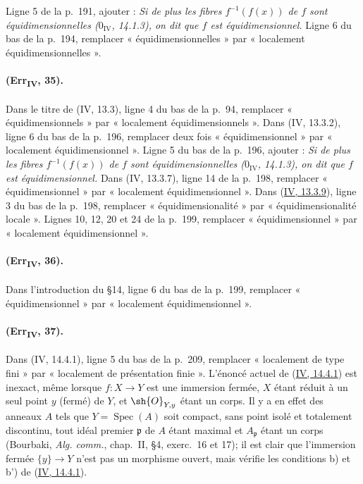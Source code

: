 Ligne 5 de la p.~191, ajouter : \emph{Si de plus les fibres
$f^{-1}(f(x))$ de $f$ sont équidimensionnelles ($0_{\mathrm{IV}}$,
14.1.3), on dit que $f$ est équidimensionnel.} Ligne 6 du bas de la
p.~194, remplacer « équidimensionnelles » par « localement
équidimensionnelles ».

\paragraph{(Err\textsubscript{IV}, 35).}
Dans le titre de (IV, 13.3), ligne 4 du bas de la p.~94, remplacer
« équidimensionnels » par « localement équidimensionnels ». Dans
(IV, 13.3.2), ligne 6 du bas de la p.~196, remplacer deux fois
« équidimensionnel » par « localement équidimensionnel ». Ligne 5 du bas
de la p.~196, ajouter : \emph{Si de plus les fibres $f^{-1}(f(x))$ de
$f$ sont équidimensionnelles ($0_{\mathrm{IV}}$, 14.1.3), on dit que
$f$ est équidimensionnel.} Dans (IV, 13.3.7), ligne 14 de la p.~198,
remplacer « équidimensionnel » par « localement équidimensionnel ».
Dans ({\hyperref[canon-index.ega4.c04.statement.13-3-9]{IV, 13.3.9}}), ligne 3 du
bas de la p.~198, remplacer « équidimensionalité » par
« équidimensionalité locale ». Lignes 10, 12, 20 et 24 de la p.~199,
remplacer « équidimensionnel » par « localement équidimensionnel ».

\paragraph{(Err\textsubscript{IV}, 36).}
Dans l'introduction du \S14, ligne 6 du bas de la p.~199, remplacer
« équidimensionnel » par « localement équidimensionnel ».

\paragraph{(Err\textsubscript{IV}, 37).}
Dans (IV, 14.4.1), ligne 5 du bas de la p.~209, remplacer « localement
de type fini » par « localement de présentation finie ». L'énoncé
actuel de ({\hyperref[canon-index.ega4.c04.thm.14-4-1]{IV, 14.4.1}}) est inexact,
même lorsque $f:X\to Y$ est une immersion fermée, $X$ étant réduit à
un seul point $y$ (fermé) de $Y$, et $\sh{O}_{Y,y}$ étant un corps. Il
y a en effet des anneaux $A$ tels que $Y=\operatorname{Spec}(A)$ soit
compact, sans point isolé et totalement discontinu, tout idéal premier
$\mathfrak p$ de $A$ étant maximal et $A_\mathfrak p$ étant un corps
(Bourbaki, \emph{Alg. comm.}, chap.~II, \S4, exerc.~16 et 17); il est
clair que l'immersion fermée $\{y\}\to Y$ n'est pas un morphisme
ouvert, mais vérifie les conditions b) et b') de
({\hyperref[canon-index.ega4.c04.thm.14-4-1]{IV, 14.4.1}}).

